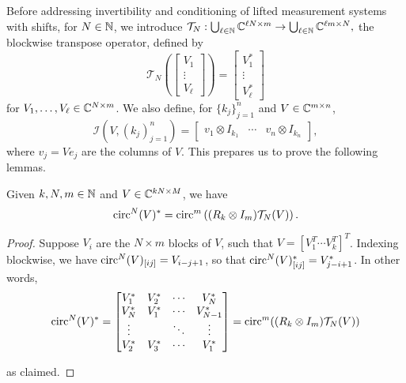 Before addressing invertibility and conditioning of lifted measurement systems with shifts, for $N \in \mathbb{N}$, we introduce $\mathcal{T}_N : \bigcup_{\ell \in \mathbb{N}} \mathbb{C}^{\ell N \times m} \to \bigcup_{\ell \in \mathbb{N}} \mathbb{C}^{\ell m \times N},$ the blockwise transpose operator, defined by \[\mathcal{T}_N\left(\begin{bmatrix} V_1 \\ \vdots \\ V_\ell \end{bmatrix}\right) = \begin{bmatrix} V_1^* \\ \vdots \\ V_{\ell}^* \end{bmatrix}\] for $V_1, \ldots, V_\ell \in \mathbb{C}^{N \times m}$.  We also define, for $\{k_j\}_{j = 1}^n$ and $V \in \mathbb{C}^{m \times n}$, \[\mathcal{I}(V, (k_j)_{j = 1}^n) = \begin{bmatrix} v_1 \otimes I_{k_1} & \cdots & v_n \otimes I_{k_n} \end{bmatrix},\]  where $v_j = V e_j$ are the columns of $V$.  This prepares us to prove the following lemmas.

\begin{lemma}
  Given $k, N, m \in \mathbb{N}$ and $V \in \mathbb{C}^{kN \times M}$, we have \[\operatorname{circ}^N(V)^* = \operatorname{circ}^m\left( (R_k \otimes I_m) \mathcal{T}_N(V) \right).\] \label{lem:circ_transpose}
\end{lemma}

\begin{proof}
  Suppose $V_i$ are the $N \times m$ blocks of $V$, such that $V = \left[V_1^T \cdots V_k^T\right]^T$.  Indexing blockwise, we have $\operatorname{circ}^N(V)_{[ij]} = V_{i - j + 1}$, so that $\operatorname{circ}^N(V)^*_{[ij]} = V_{j - i + 1}^*$.  In other words,
  \[
  \operatorname{circ}^N(V)^* = \begin{bmatrix} V_1^* & V_2^* & \cdots & V_N^* \\ V_N^* & V_1^* & \cdots & V_{N - 1}^* \\ \vdots & & \ddots & \vdots \\ V_2^* & V_3^* & \cdots & V_1^* \end{bmatrix} = \operatorname{circ}^m((R_k \otimes I_m) \mathcal{T}_N(V) )
  \]

  as claimed.
  
\end{proof}

